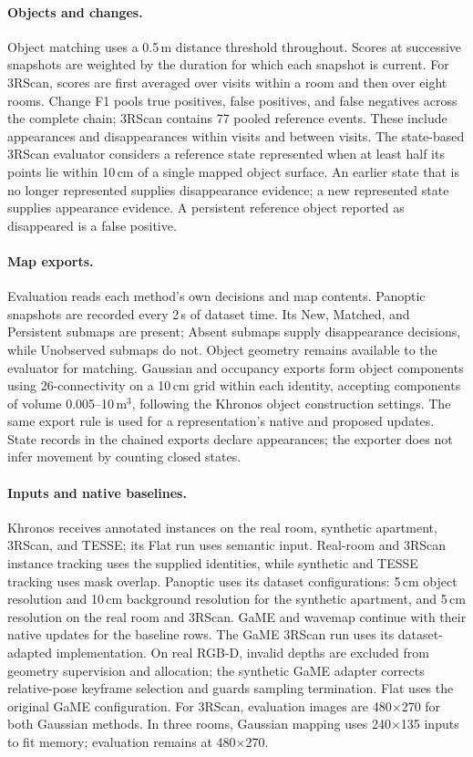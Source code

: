 \paragraph{Objects and changes.}
Object matching uses a 0.5\,m distance threshold throughout. Scores at successive snapshots are weighted by the
duration for which each snapshot is current. For 3RScan, scores are first averaged over visits within a room
and then over eight rooms. Change F1 pools true positives, false positives, and false negatives across the
complete chain; 3RScan contains 77 pooled reference events. These include appearances and disappearances
within visits and between visits.
The state-based 3RScan evaluator considers a reference state represented when at least half its points lie
within 10\,cm of a single mapped object surface. An earlier state that is no longer represented supplies
disappearance evidence; a new represented state supplies appearance evidence. A persistent reference object
reported as disappeared is a false positive.

\paragraph{Map exports.}
Evaluation reads each method's own decisions and map contents. Panoptic snapshots are recorded every 2\,s of
dataset time. Its New, Matched, and Persistent submaps are present; Absent submaps supply disappearance
decisions, while Unobserved submaps do not. Object geometry remains available to the evaluator for matching.
Gaussian and occupancy exports form object components using 26-connectivity on a 10\,cm grid within each
identity, accepting components of volume 0.005--10\,m$^3$, following the Khronos object construction settings.
The same export rule is used for a representation's native and proposed updates. State records in the chained
exports declare appearances; the exporter does not infer movement by counting closed states.

\paragraph{Inputs and native baselines.}
Khronos receives annotated instances on the real room, synthetic apartment, 3RScan, and TESSE; its Flat run
uses semantic input. Real-room and 3RScan instance tracking uses the supplied identities, while synthetic and
TESSE tracking uses mask overlap. Panoptic uses its dataset configurations: 5\,cm object resolution and
10\,cm background resolution for the synthetic apartment, and 5\,cm resolution on the real room and 3RScan.
GaME and wavemap continue with their native updates for the baseline rows. The GaME 3RScan run uses its
dataset-adapted implementation. On real RGB-D, invalid depths are excluded from geometry supervision and
allocation; the synthetic GaME adapter corrects relative-pose keyframe selection and guards sampling termination.
Flat uses the original GaME configuration.
For 3RScan, evaluation images are 480$\times$270 for both Gaussian methods. In three rooms, Gaussian mapping
uses 240$\times$135 inputs to fit memory; evaluation remains at 480$\times$270.

